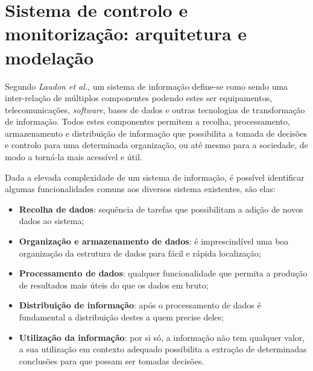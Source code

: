 

\chapter{Sistema de controlo e monitorização: arquitetura e modelação}










Segundo \textit{Laudon et al.}\cite{Laudon1998}, um sistema de informação define-se como sendo uma inter-relação de múltiplos componentes podendo estes ser equipamentos, telecomunicações, \textit{software}, bases de dados e outras tecnologias de transformação de informação. Todos estes componentes permitem a recolha, processamento, armazenamento e distribuição de informação que possibilita a tomada de decisões e controlo para uma determinada organização, ou até mesmo para a sociedade, de modo a torná-la mais acessível e útil.

Dada a elevada complexidade de um sistema de informação, é possível identificar algumas funcionalidades comuns aos diversos sistema existentes, são elas\cite{Turban1996}: 

\begin{itemize}
	\item \textbf{Recolha de dados}: sequência de tarefas que possibilitam a adição de novos dados ao sistema;
	
	\item \textbf{Organização e armazenamento de dados}: é imprescindível uma boa organização da estrutura de dados para fácil e rápida localização;
	
	\item \textbf{Processamento de dados}: qualquer funcionalidade que permita a produção de resultados mais úteis do que os dados em bruto; 
	
	\item \textbf{Distribuição de informação}: após o processamento de dados é fundamental a distribuição destes a quem precise deles; 
	
	\item \textbf{Utilização da informação}: por si só, a informação não tem qualquer valor, a sua utilização em contexto adequado possibilita a extração de determinadas conclusões para que possam ser tomadas decisões.
	
\end{itemize}


